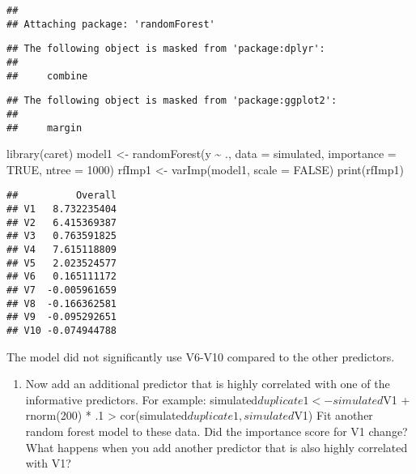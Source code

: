 \documentclass[
]{article}
\newenvironment{Shaded}{\begin{snugshade}}{\end{snugshade}}
\newcommand{\AttributeTok}[1]{\textcolor[rgb]{0.77,0.63,0.00}{#1}}
\newcommand{\ConstantTok}[1]{\textcolor[rgb]{0.00,0.00,0.00}{#1}}
\newcommand{\DecValTok}[1]{\textcolor[rgb]{0.00,0.00,0.81}{#1}}
\newcommand{\FunctionTok}[1]{\textcolor[rgb]{0.00,0.00,0.00}{#1}}
\newcommand{\NormalTok}[1]{#1}
\newcommand{\OtherTok}[1]{\textcolor[rgb]{0.56,0.35,0.01}{#1}}
\newcommand{\SpecialCharTok}[1]{\textcolor[rgb]{0.00,0.00,0.00}{#1}}
\providecommand{\tightlist}{%
  \setlength{\itemsep}{0pt}\setlength{\parskip}{0pt}}
\begin{document}
\begin{verbatim}
## 
## Attaching package: 'randomForest'
\end{verbatim}

\begin{verbatim}
## The following object is masked from 'package:dplyr':
## 
##     combine
\end{verbatim}

\begin{verbatim}
## The following object is masked from 'package:ggplot2':
## 
##     margin
\end{verbatim}

\begin{Shaded}
\begin{Highlighting}[]
\FunctionTok{library}\NormalTok{(caret)}
\NormalTok{model1 }\OtherTok{\textless{}{-}} \FunctionTok{randomForest}\NormalTok{(y }\SpecialCharTok{\textasciitilde{}}\NormalTok{ ., }\AttributeTok{data =}\NormalTok{ simulated, }\AttributeTok{importance =} \ConstantTok{TRUE}\NormalTok{,}
\AttributeTok{ntree =} \DecValTok{1000}\NormalTok{) }
\NormalTok{rfImp1 }\OtherTok{\textless{}{-}} \FunctionTok{varImp}\NormalTok{(model1, }\AttributeTok{scale =} \ConstantTok{FALSE}\NormalTok{)}
\FunctionTok{print}\NormalTok{(rfImp1)}
\end{Highlighting}
\end{Shaded}

\begin{verbatim}
##          Overall
## V1   8.732235404
## V2   6.415369387
## V3   0.763591825
## V4   7.615118809
## V5   2.023524577
## V6   0.165111172
## V7  -0.005961659
## V8  -0.166362581
## V9  -0.095292651
## V10 -0.074944788
\end{verbatim}

The model did not significantly use V6-V10 compared to the other
predictors.

\begin{enumerate}
\def\labelenumi{(\alph{enumi})}
\setcounter{enumi}{1}
\tightlist
\item
  Now add an additional predictor that is highly correlated with one of
  the informative predictors. For example:
  simulated\(duplicate1 <- simulated\)V1 + rnorm(200) * .1
  \textgreater{} cor(simulated\(duplicate1, simulated\)V1) Fit another
  random forest model to these data. Did the importance score for V1
  change? What happens when you add another predictor that is also
  highly correlated with V1?
\end{enumerate}
\end{document}
